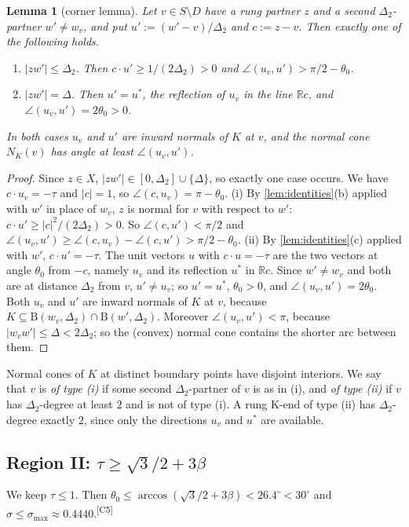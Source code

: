\documentclass[11pt]{amsart}
\newtheorem{lemma}[theorem]{Lemma}
\theoremstyle{definition}
\theoremstyle{remark}
\newcommand{\R}{\mathbb{R}}
\newcommand{\Dt}{\Delta_2}
\newcommand{\Dd}{\mathrm{B}}      %
\newcommand{\chk}[1]{\textsuperscript{[#1]}}
\begin{document}
\begin{lemma}[corner lemma]\label{lem:corner}
Let $v\in S\setminus D$ have a rung partner $z$ and a second $\Dt$-partner $w'\neq w_v$, and put $u':=(w'-v)/\Dt$ and $c:=z-v$. Then exactly one of the following holds.
\begin{enumerate}[label=\textup{(\roman*)}]
\item $|zw'|\le\Dt$. Then $c\cdot u'\ge1/(2\Dt)>0$ and $\angle(u_v,u')>\pi/2-\theta_0$.
\item $|zw'|=\Delta$. Then $u'=u^*$, the reflection of $u_v$ in the line $\R c$, and $\angle(u_v,u')=2\theta_0>0$.
\end{enumerate}
In both cases $u_v$ and $u'$ are inward normals of $K$ at $v$, and the normal cone $N_K(v)$ has angle at least $\angle(u_v,u')$.
\end{lemma}
\begin{proof}
Since $z\in X$, $|zw'|\in[0,\Dt]\cup\{\Delta\}$, so exactly one case occurs. We have $c\cdot u_v=-\tau$ and $|c|=1$, so $\angle(c,u_v)=\pi-\theta_0$.
(i) By \cref{lem:identities}(b) applied with $w'$ in place of $w_v$, $z$ is normal for $v$ with respect to $w'$: $c\cdot u'\ge|c|^2/(2\Dt)>0$. So $\angle(c,u')<\pi/2$ and $\angle(u_v,u')\ge\angle(c,u_v)-\angle(c,u')>\pi/2-\theta_0$.
(ii) By \cref{lem:identities}(c) applied with $w'$, $c\cdot u'=-\tau$. The unit vectors $u$ with $c\cdot u=-\tau$ are the two vectors at angle $\theta_0$ from $-c$, namely $u_v$ and its reflection $u^*$ in $\R c$. Since $w'\neq w_v$ and both are at distance $\Dt$ from $v$, $u'\neq u_v$; so $u'=u^*$, $\theta_0>0$, and $\angle(u_v,u')=2\theta_0$.
Both $u_v$ and $u'$ are inward normals of $K$ at $v$, because $K\subseteq\Dd(w_v,\Dt)\cap\Dd(w',\Dt)$. Moreover $\angle(u_v,u')<\pi$, because $|w_vw'|\le\Delta<2\Dt$; so the (convex) normal cone contains the shorter arc between them.
\end{proof}
Normal cones of $K$ at distinct boundary points have disjoint interiors. We say that $v$ is \emph{of type \textup{(i)}} if some second $\Dt$-partner of $v$ is as in (i), and \emph{of type \textup{(ii)}} if $v$ has $\Dt$-degree at least $2$ and is not of type (i). A rung K-end of type (ii) has $\Dt$-degree exactly $2$, since only the directions $u_v$ and $u^*$ are available.

\subsection{Region II: \texorpdfstring{$\tau\ge\sqrt3/2+3\beta$}{tau >= sqrt3/2 + 3 beta}}\label{sec:regionII}
We keep $\tau\le1$. Then $\theta_0\le\arccos(\sqrt3/2+3\beta)<26.4^\circ<30^\circ$ and $\sigma\le\sigma_{\max}\approx0.4440$.\chk{C5}
\end{document}
